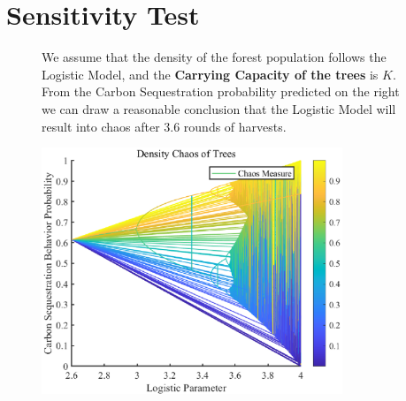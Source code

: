 \documentclass{mcmthesis}
\numberwithin{figure}{section}
\numberwithin{table}{section}
\numberwithin{equation}{section}
\begin{document}




















\section{Sensitivity Test}
\begin{figure}[ht]
  \begin{minipage}[htbp]{0.4\linewidth}
    We assume that the density of the forest population follows the Logistic Model,
    and the \textbf{Carrying Capacity of the trees} is $ K $. From the Carbon Sequestration
    probability predicted on the right we can draw a reasonable conclusion that
    the Logistic Model will result into chaos after 3.6 rounds of harvests. 

  \end{minipage}
  \hfill
  \begin{minipage}[htbp]{0.55\linewidth}
    \begin{flushright}
      \includegraphics[width = 9cm]{code&pic/Logistic.eps}
    \end{flushright}
  \end{minipage}
\end{figure}
\end{document}

